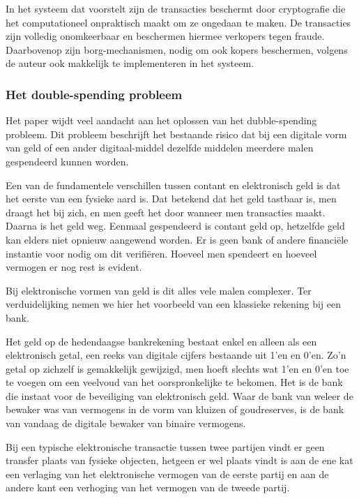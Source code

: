 			In het systeem dat \textcite{Nakamoto2008} voorstelt zijn de transacties beschermt door cryptografie die het computationeel onpraktisch maakt om ze ongedaan te maken. De transacties zijn volledig onomkeerbaar en beschermen hiermee verkopers tegen fraude. Daarbovenop zijn borg-mechanismen, nodig om ook kopers beschermen, volgens de auteur ook makkelijk te implementeren in het systeem.
			
			\subsubsection{Het double-spending probleem}
			Het paper wijdt veel aandacht aan het oplossen van het dubble-spending probleem. Dit probleem beschrijft het bestaande risico dat bij een digitale vorm van geld of een ander digitaal-middel dezelfde middelen meerdere malen gespendeerd kunnen worden.
			
			Een van de fundamentele verschillen tussen contant en elektronisch geld is dat het eerste van een fysieke aard is. Dat betekend dat het geld tastbaar is, men draagt het bij zich, en men geeft het door wanneer men transacties maakt. Daarna is het geld weg. Eenmaal gespendeerd is contant geld op, hetzelfde geld kan elders niet opnieuw aangewend worden. Er is geen bank of andere financiële instantie voor nodig om dit verifiëren. Hoeveel men spendeert en hoeveel vermogen er nog rest is evident. 
			
			Bij elektronische vormen van geld is dit alles vele malen complexer. Ter verduidelijking nemen we hier het voorbeeld van een klassieke rekening bij een bank.
			
			Het geld op de hedendaagse bankrekening bestaat enkel en alleen als een elektronisch getal, een reeks van digitale cijfers bestaande uit 1’en en 0’en. Zo’n getal op zichzelf is gemakkelijk gewijzigd, men hoeft slechts wat 1’en en 0’en toe te voegen om een veelvoud van het oorspronkelijke te bekomen. Het is de bank die instaat voor de beveiliging van elektronisch geld. Waar de bank van weleer de bewaker was van vermogens in de vorm van kluizen of goudreserves, is de bank van vandaag de digitale bewaker van binaire vermogens.
			
			Bij een typische elektronische transactie tussen twee partijen vindt er geen transfer plaats van fysieke objecten, hetgeen er wel plaats vindt is aan de ene kat een verlaging van het elektronische vermogen van de eerste partij en aan de andere kant een verhoging van het vermogen van de tweede partij. 
		
